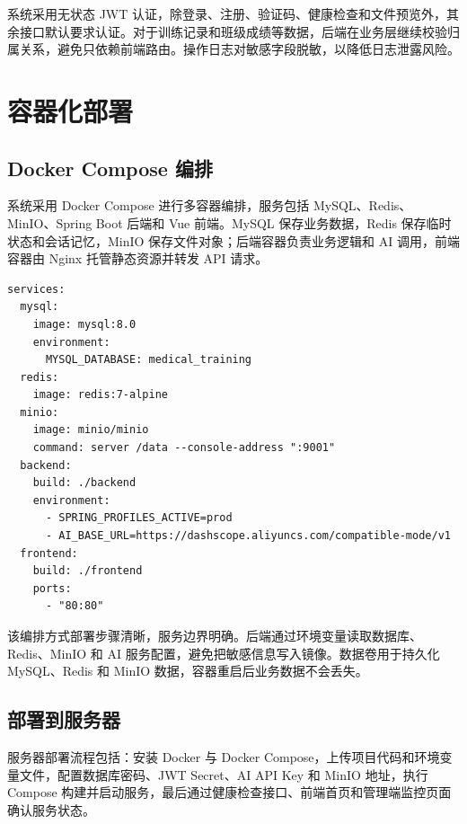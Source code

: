 系统采用无状态 JWT 认证，除登录、注册、验证码、健康检查和文件预览外，其余接口默认要求认证。对于训练记录和班级成绩等数据，后端在业务层继续校验归属关系，避免只依赖前端路由。操作日志对敏感字段脱敏，以降低日志泄露风险。

\section{容器化部署}

\subsection{Docker Compose 编排}

系统采用 Docker Compose 进行多容器编排，服务包括 MySQL、Redis、MinIO、Spring Boot 后端和 Vue 前端。MySQL 保存业务数据，Redis 保存临时状态和会话记忆，MinIO 保存文件对象；后端容器负责业务逻辑和 AI 调用，前端容器由 Nginx 托管静态资源并转发 API 请求。

\begin{lstlisting}[style=yaml, caption={Docker Compose 服务编排节选}, label={lst:docker_compose}]
services:
  mysql:
    image: mysql:8.0
    environment:
      MYSQL_DATABASE: medical_training
  redis:
    image: redis:7-alpine
  minio:
    image: minio/minio
    command: server /data --console-address ":9001"
  backend:
    build: ./backend
    environment:
      - SPRING_PROFILES_ACTIVE=prod
      - AI_BASE_URL=https://dashscope.aliyuncs.com/compatible-mode/v1
  frontend:
    build: ./frontend
    ports:
      - "80:80"
\end{lstlisting}

该编排方式部署步骤清晰，服务边界明确。后端通过环境变量读取数据库、Redis、MinIO 和 AI 服务配置，避免把敏感信息写入镜像。数据卷用于持久化 MySQL、Redis 和 MinIO 数据，容器重启后业务数据不会丢失。

\subsection{部署到服务器}

服务器部署流程包括：安装 Docker 与 Docker Compose，上传项目代码和环境变量文件，配置数据库密码、JWT Secret、AI API Key 和 MinIO 地址，执行 Compose 构建并启动服务，最后通过健康检查接口、前端首页和管理端监控页面确认服务状态。


